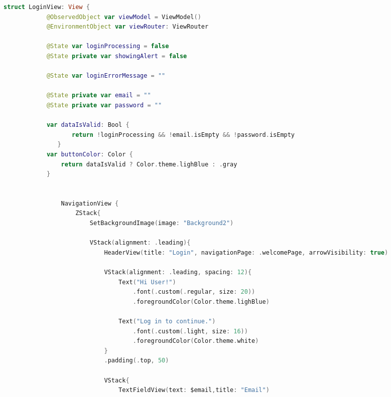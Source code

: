 \begin{spacing}{2}
\end{spacing}
\begin{minipage}{\textwidth}
    \linespread{0.8}\selectfont
    \begin{lstlisting}[language=swift]
        struct LoginView: View {
            @ObservedObject var viewModel = ViewModel()
            @EnvironmentObject var viewRouter: ViewRouter
            
            @State var loginProcessing = false
            @State private var showingAlert = false
            
            @State var loginErrorMessage = ""
            
            @State private var email = ""
            @State private var password = ""
            
            var dataIsValid: Bool {
                   return !loginProcessing && !email.isEmpty && !password.isEmpty
               }
            var buttonColor: Color {
                return dataIsValid ? Color.theme.lighBlue : .gray
            }
            
            
                NavigationView {
                    ZStack{
                        SetBackgroundImage(image: "Background2")
                        
                        VStack(alignment: .leading){
                            HeaderView(title: "Login", navigationPage: .welcomePage, arrowVisibility: true)
                           
                            VStack(alignment: .leading, spacing: 12){
                                Text("Hi User!")
                                    .font(.custom(.regular, size: 20))
                                    .foregroundColor(Color.theme.lighBlue)
        
                                Text("Log in to continue.")
                                    .font(.custom(.light, size: 16))
                                    .foregroundColor(Color.theme.white)
                            }
                            .padding(.top, 50)
                            
                            VStack{
                                TextFieldView(text: $email,title: "Email")
                                

\end{lstlisting}
\end{minipage}
